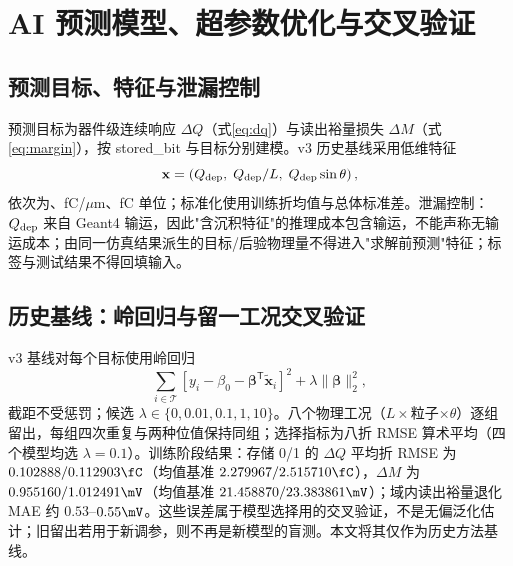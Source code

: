 \section{AI 预测模型、超参数优化与交叉验证}

\subsection{预测目标、特征与泄漏控制}

预测目标为器件级连续响应 $\Delta Q$（式\eqref{eq:dq}）与读出裕量损失 $\Delta M$（式\eqref{eq:margin}），按 stored\_bit 与目标分别建模。v3 历史基线采用低维特征
\begin{equation}
\mathbf x=\left(Q_{\rm dep},\;Q_{\rm dep}/L,\;Q_{\rm dep}\sin\theta\right),
\label{eq:features}
\end{equation}
依次为\fC、fC/$\mu$m、fC 单位；标准化使用训练折均值与总体标准差。泄漏控制：$Q_{\rm dep}$ 来自 Geant4 输运，因此"含沉积特征"的推理成本包含输运，不能声称无输运成本；由同一仿真结果派生的目标/后验物理量不得进入"求解前预测"特征；标签与测试结果不得回填输入。

\subsection{历史基线：岭回归与留一工况交叉验证}

v3 基线对每个目标使用岭回归
\begin{equation}
\sum_{i\in\mathcal T}\left[y_i-\beta_0-\boldsymbol\beta^{\mathsf T}\widetilde{\mathbf x}_i\right]^2
+\lambda\|\boldsymbol\beta\|_2^2,
\end{equation}
截距不受惩罚；候选 $\lambda\in\{0,0.01,0.1,1,10\}$。八个物理工况（$L\times$粒子$\times\theta$）逐组留出，每组四次重复与两种位值保持同组；选择指标为八折 RMSE 算术平均（四个模型均选 $\lambda=0.1$）。训练阶段结果：存储 0/1 的 $\Delta Q$ 平均折 RMSE 为 $0.102888/0.112903\fC$（均值基准 $2.279967/2.515710\fC$），$\Delta M$ 为 $0.955160/1.012491\mV$（均值基准 $21.458870/23.383861\mV$）；域内读出裕量退化 MAE 约 $0.53$--$0.55\mV$。这些误差属于模型选择用的交叉验证，不是无偏泛化估计；旧留出若用于新调参，则不再是新模型的盲测。本文将其仅作为历史方法基线。

